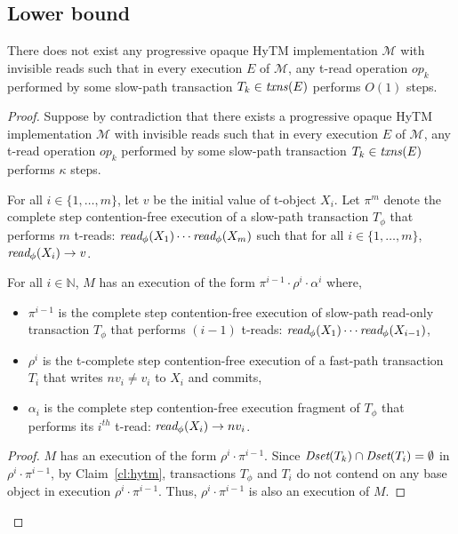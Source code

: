 \subsection{Lower bound}
%
%
\begin{theorem}
\label{th:impossibility}
There does not exist any progressive opaque HyTM implementation $\mathcal{M}$ with invisible reads such that in every execution $E$ of $\mathcal{M}$, any t-read operation $op_k$ performed by some slow-path transaction $T_k \in \ms{txns}(E)$
performs $O(1)$ steps.
\end{theorem}
%
\begin{proof}
Suppose by contradiction that there exists a progressive opaque HyTM implementation $\mathcal{M}$ with invisible reads such that in every execution $E$ of $\mathcal{M}$, any t-read operation $op_k$ performed by some slow-path transaction $T_k \in \ms{txns}(E)$
performs $\kappa$ steps.

For all $i\in \{1,\ldots , m\}$, let $v$ be the initial value of t-object $X_i$.
Let $\pi^{m}$ denote the complete step contention-free execution of a slow-path transaction
$T_{\phi}$ that performs ${m}$ t-reads: $\textit{read}_{\phi}(X_1)\cdots \textit{read}_{\phi}(X_{m})$
such that for all $i\in \{1,\ldots , m \}$, $\textit{read}_{\phi}(X_i) \rightarrow v$.
%
\begin{claim}
\label{cl:readdap}
For all $i\in \mathbb{N}$, $M$ has an execution of the form $\pi^{i-1}\cdot \rho^i\cdot \alpha^i$ where,
%
\begin{itemize}
\item
$\pi^{i-1}$ is the complete step contention-free execution of slow-path read-only transaction $T_{\phi}$ that performs
$(i-1)$ t-reads: $\textit{read}_{\phi}(X_1)\cdots \textit{read}_{\phi}(X_{i-1})$,
\item
$\rho^i$ is the t-complete step contention-free execution of a fast-path transaction $T_{i}$
that writes $nv_i\neq v_i$ to $X_i$ and commits,
\item
$\alpha_i$ is the complete step contention-free execution fragment of $T_{\phi}$ that performs its $i^{th}$ t-read:
$\textit{read}_{\phi}(X_i) \rightarrow nv_i$.
\end{itemize}
%
\end{claim}
%
\begin{proof}
%
$M$ has an execution of the form $\rho^i\cdot \pi^{i-1}$.
Since $\textit{Dset}(T_k) \cap \textit{Dset}(T_{i}) =\emptyset$ in $\rho^i\cdot \pi^{i-1}$,
by Claim~\ref{cl:hytm}, transactions $T_{\phi}$ and $T_i$ do not contend
on any base object in execution $\rho^i\cdot \pi^{i-1}$.
Thus, $\rho^i\cdot \pi^{i-1}$ is also an execution of $M$.


\end{proof}
\end{proof}
